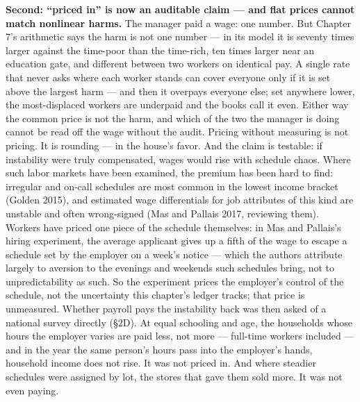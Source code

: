 \textbf{Second: ``priced in'' is now an auditable claim --- and flat prices
cannot match nonlinear harms.} The manager paid a wage: one number.
But Chapter 7's arithmetic says the harm is not one number --- in its
model it is seventy times larger against the time-poor than the
time-rich, ten times larger near an education gate, and different
between two workers on identical pay. A single rate that never asks where each
worker stands can cover everyone only if it is set above the largest
harm --- and then it overpays everyone else; set anywhere lower, the
most-displaced workers are underpaid and the books call it even. Either
way the common price is not the harm, and which of the two the manager
is doing cannot be read off the wage without the audit. Pricing without
measuring is not pricing. It is rounding --- in the house's favor. And
the claim is testable: if instability were truly compensated, wages
would rise with schedule chaos. Where such labor markets have been
examined, the premium has been hard to find: irregular and on-call
schedules are most common in the lowest income bracket (Golden 2015),
and estimated wage differentials for job attributes of this kind are
unstable and often wrong-signed (Mas and Pallais 2017, reviewing them).
Workers have priced one piece of the schedule themselves: in Mas and
Pallais's hiring experiment, the average applicant gives up a fifth of
the wage to escape a schedule set by the employer on a week's notice ---
which the authors attribute largely to aversion to the evenings and
weekends such schedules bring, not to unpredictability as such. So the
experiment prices the employer's control of the schedule, not the
uncertainty this chapter's ledger tracks; that price is unmeasured.
Whether payroll pays the instability back was then asked of a national
survey directly (§2D). At equal schooling and age, the households
whose hours the employer varies are paid less, not more --- full-time
workers included --- and in the year the same person's hours pass into
the employer's hands, household income does not rise. It was not
priced in. And where steadier schedules were assigned by lot, the
stores that gave them sold more. It was not even paying.

